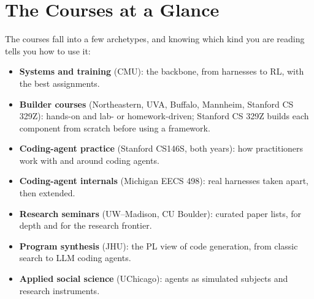 \documentclass[10pt,oneside]{report}
\begin{document}
\chapter{The Courses at a Glance}
The courses fall into a few archetypes, and knowing which kind you are reading tells you how to use it:
\begin{itemize}
\item \textbf{Systems and training} (CMU): the backbone, from harnesses to RL, with the best assignments.
\item \textbf{Builder courses} (Northeastern, UVA, Buffalo, Mannheim, Stanford CS 329Z): hands-on and lab- or homework-driven; Stanford CS 329Z builds each component from scratch before using a framework.
\item \textbf{Coding-agent practice} (Stanford CS146S, both years): how practitioners work with and around coding agents.
\item \textbf{Coding-agent internals} (Michigan EECS 498): real harnesses taken apart, then extended.
\item \textbf{Research seminars} (UW--Madison, CU Boulder): curated paper lists, for depth and for the research frontier.
\item \textbf{Program synthesis} (JHU): the PL view of code generation, from classic search to LLM coding agents.
\item \textbf{Applied social science} (UChicago): agents as simulated subjects and research instruments.
\end{itemize}
\end{document}

